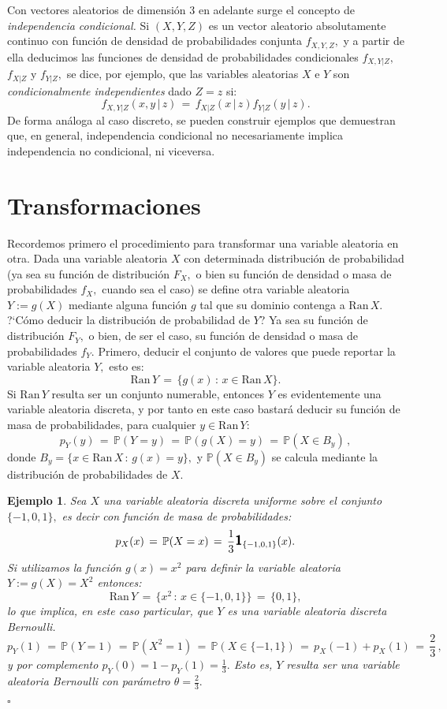 \documentclass[spanish,10pt,letterpaper]{article}
\newtheorem{ejem}{Ejemplo}
\newcommand{\prob}{\mathbb{P}}
\newcommand{\indic}{\textbf{\textsf{\large{1}}}}
\newcommand{\qed}{\begin{flushright}$\square$\end{flushright}}
\begin{document}
\medskip 

Con vectores aleatorios de dimensión $3$ en adelante surge el concepto de \textit{independencia condicional.} Si $(X,Y,Z)$ es un vector aleatorio absolutamente continuo con función de densidad de probabilidades conjunta $f_{X,Y,Z},$ y a partir de ella deducimos las funciones de densidad de probabilidades condicionales $f_{X,Y|Z},$ $f_{X|Z}$ y $f_{Y|Z},$ se dice, por ejemplo, que las variables aleatorias $X$ e $Y$ son \textit{condicionalmente independientes} dado $Z=z$ si:
$$f_{X,Y|Z}(x,y\,|\,z) \,=\, f_{X|Z}(x\,|\,z)f_{Y|Z}(y\,|\,z).$$
De forma análoga al caso discreto, se pueden construir ejemplos que demuestran que, en general, independencia condicional no necesariamente implica independencia no condicional, ni viceversa.





\newpage
\section{Transformaciones}\label{sec:transf}

Recordemos primero el procedimiento para transformar una variable aleatoria en otra. Dada una variable aleatoria $X$ con determinada distribución de probabilidad (ya sea su función de distribución $F_X,$ o bien su función de densidad o masa de probabilidades $f_X,$ cuando sea el caso) se define otra variable aleatoria $Y:=g(X)$ mediante alguna función $g$ tal que su dominio contenga a $\text{Ran}\,X.$ ?`Cómo deducir la distribución de probabilidad de $Y$? Ya sea su función de distribución $F_Y,$ o bien, de ser el caso, su función de densidad o masa de probabilidades $f_Y.$ Primero, deducir el conjunto de valores que puede reportar la variable aleatoria $Y,$ esto es: 
$$\text{Ran}\,Y \,=\, \{g(x)\,:\,x\in\text{Ran}\,X\}.$$ Si $\text{Ran}\,Y$ resulta ser un conjunto numerable, entonces $Y$ es evidentemente una variable aleatoria discreta, y por tanto en este caso bastará deducir su función de masa de probabilidades, para cualquier $y\in\text{Ran}\,Y:$
$$p_Y(y) \,=\, \prob(Y=y) \,=\, \prob(g(X)=y) \,=\, \prob(X\in B_y)\,,$$
donde $B_y=\{x\in\text{Ran}\,X\,:\,g(x)=y\},$ y  $\prob(X\in B_y)$ se calcula mediante la distribución de probabilidades de $X.$

\bigskip 

\begin{ejem}\label{ej:disadis}
    Sea $X$ una variable aleatoria discreta uniforme sobre el conjunto $\{-1,0,1\},$ es decir con función de masa de probabilidades:
    $$p_X(x) \,=\, \prob(X=x) \,=\, \frac{1}{3}\indic_{\{-1,0,1\}}(x).$$
    Si utilizamos la función $g(x)=x^2$ para definir la variable aleatoria $Y:=g(X)=X^2$ entonces:
    $$\text{Ran}\,Y \,=\,\{x^2\,:\,x\in\{-1,0,1\}\} \,=\, \{0,1\},$$
    lo que implica, en este caso particular, que $Y$ es una variable aleatoria discreta \textit{Bernoulli}.
    $$p_Y(1) \,=\, \prob(Y=1) \,=\, \prob(X^2=1) \,=\, \prob(X\in\{-1,1\}) \,=\, p_X(-1)+p_X(1) \,=\, \frac{2}{3}\,,$$
    y por complemento $p_Y(0)=1-p_Y(1)=\frac{1}{3}.$ Esto es, $Y$ resulta ser una variable aleatoria Bernoulli con par\'ametro $\theta=\frac{2}{3}.$ \qed 
\end{ejem}
\end{document}
